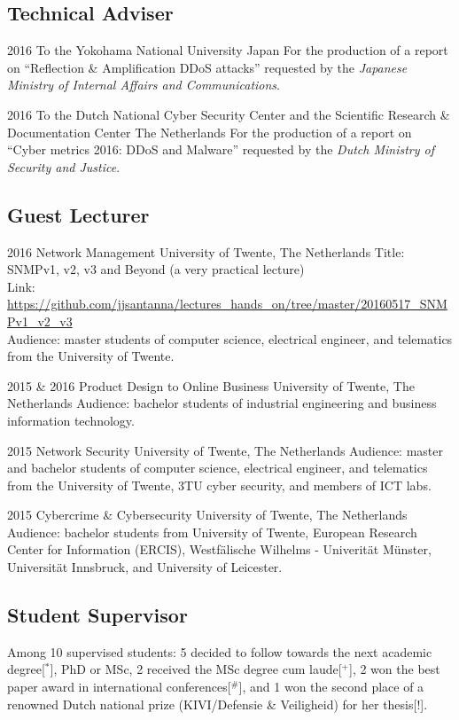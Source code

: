 \documentclass[print]{styles/friggeri-cv-linux} %
\begin{document}
\subsection{Technical Adviser}
\begin{entrylist}
\entry
{2016}
{To the Yokohama National University}
{Japan}
{For the production of a report on ``Reflection \& Amplification DDoS attacks'' requested by the \emph{Japanese Ministry of Internal Affairs and Communications}.}

\entry
{2016}
{To the Dutch National Cyber Security Center and the Scientific Research \& Documentation Center}
{The Netherlands}
{For the production of a report on ``Cyber metrics 2016: DDoS and Malware'' requested by the \emph{Dutch Ministry of Security and Justice}.}
\end{entrylist}



\newpage
\subsection{Guest Lecturer}
\begin{entrylist}
\entry
{2016}
{Network Management}
{University of Twente, The Netherlands}
{Title: SNMPv1, v2, v3 and Beyond (a very practical lecture)\\
Link: \url{https://github.com/jjsantanna/lectures_hands_on/tree/master/20160517_SNMPv1_v2_v3}\\
Audience: master students of computer science, electrical engineer, and telematics from the University of Twente. }

\entry
{2015 \& 2016}
{Product Design to Online Business}
{University of Twente, The Netherlands}
{Audience: bachelor students of industrial engineering and business information technology.}

\entry
{2015}
{Network Security}
{University of Twente, The Netherlands}
{Audience: master and bachelor students of computer science, electrical engineer, and telematics from the University of Twente, 3TU cyber security, and members of ICT labs. }

\entry
{2015}
{Cybercrime \& Cybersecurity}
{University of Twente, The Netherlands}
{Audience: bachelor students from University of Twente, European Research Center for Information (ERCIS), Westfälische Wilhelms - Univerität Münster, Universität Innsbruck, and University of Leicester. }
\end{entrylist}

\subsection{Student Supervisor}
Among 10 supervised students: 5 decided to follow towards the next academic degree[$^*$], PhD or MSc, 2 received the MSc degree cum laude[$^+$], 2 won the best paper award in international conferences[$^\#$], and 1 won the second place of a renowned Dutch national prize (KIVI/Defensie \& Veiligheid) for her thesis[$!$].
\end{document}
